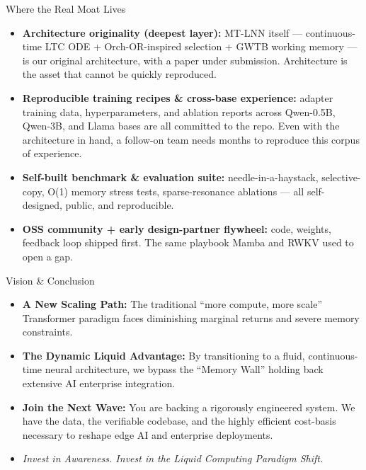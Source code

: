 ﻿\documentclass[aspectratio=169, 10pt]{beamer}
\begin{document}
\begin{frame}{Where the Real Moat Lives}
\small
\begin{itemize}\itemsep=0.5em
    \item \textbf{Architecture originality (deepest layer):} MT-LNN itself --- continuous-time LTC ODE + Orch-OR-inspired selection + GWTB working memory --- is our original architecture, with a paper under submission. Architecture is the asset that cannot be quickly reproduced.
    \item \textbf{Reproducible training recipes \& cross-base experience:} adapter training data, hyperparameters, and ablation reports across Qwen-0.5B, Qwen-3B, and Llama bases are all committed to the repo. Even with the architecture in hand, a follow-on team needs months to reproduce this corpus of experience.
    \item \textbf{Self-built benchmark \& evaluation suite:} needle-in-a-haystack, selective-copy, O(1) memory stress tests, sparse-resonance ablations --- all self-designed, public, and reproducible.
    \item \textbf{OSS community + early design-partner flywheel:} code, weights, feedback loop shipped first. The same playbook Mamba and RWKV used to open a gap.
\end{itemize}
\end{frame}

\begin{frame}{Vision \& Conclusion}
\begin{itemize}
    \item \textbf{A New Scaling Path:} The traditional ``more compute, more scale'' Transformer paradigm faces diminishing marginal returns and severe memory constraints.
    \item \textbf{The Dynamic Liquid Advantage:} By transitioning to a fluid, continuous-time neural architecture, we bypass the ``Memory Wall'' holding back extensive AI enterprise integration.
    \item \textbf{Join the Next Wave:} You are backing a rigorously engineered system. We have the data, the verifiable codebase, and the highly efficient cost-basis necessary to reshape edge AI and enterprise deployments.
    \vspace{0.5em}
    \item \textit{Invest in Awareness. Invest in the Liquid Computing Paradigm Shift.}
\end{itemize}
\end{frame}
\end{document}
